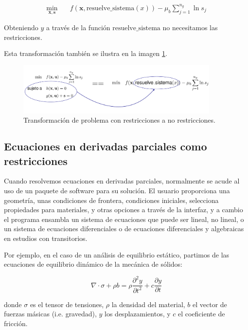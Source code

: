 \begin{align} \label{eq:optimization_with_system_solving}
	\min_{\mathbf{x}, \mathbf{s}} \quad & f(\mathbf{x}, \text{resuelve\_sistema}(x)) - \mu_b \sum_{j=1}^{n_g} \ln s_j
\end{align}

Obteniendo $y$ a través de la función $\text{resuelve\_sistema}$ no necesitamos las restricciones.

Esta transformación también se ilustra en la imagen \ref{fig:constraints_to_no_constraints}.

\begin{figure}[h]
	\centering
	\includegraphics[width=0.9\textwidth]{./capitulos/metodologia/images/constraints_to_no_constraints.png}
	\caption{Transformación de problema con restricciones a no restricciones.}
	\label{fig:constraints_to_no_constraints}
\end{figure}

\subsection{Ecuaciones en derivadas parciales como restricciones}

Cuando resolvemos ecuaciones en derivadas parciales, normalmente se acude al
uso de un paquete de software para su solución. El usuario proporciona una
geometría, unas condiciones de frontera, condiciones iniciales, selecciona
propiedades para materiales, y otras opciones a través de la interfaz, y a
cambio el programa ensambla un sistema de ecuaciones que puede ser lineal, no
lineal, o un sistema de ecuaciones diferenciales o de ecuaciones diferenciales
y algebraicas en estudios con transitorios.

Por ejemplo, en el caso de un análisis de equilibrio estático, partimos de las
ecuaciones de equilibrio dinámico de la mecánica de sólidos:

\begin{equation}
	\nabla \cdot \sigma + \rho b = \rho \frac{\partial^2 y}{\partial t^2} + c \frac{\partial y}{\partial t}
\end{equation}

donde $\sigma$ es el tensor de tensiones, $\rho$ la densidad del material, $b$
el vector de fuerzas másicas (i.e. gravedad), $y$ los desplazamientos, y $c$ el
coeficiente de fricción.


